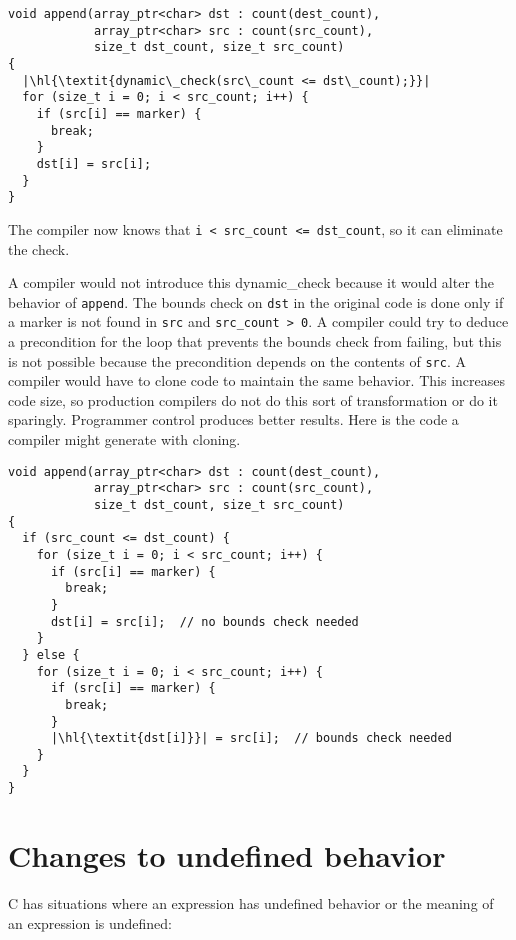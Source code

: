 \begin{lstlisting}[escapechar=\|]
void append(array_ptr<char> dst : count(dest_count),
            array_ptr<char> src : count(src_count),
            size_t dst_count, size_t src_count)
{
  |\hl{\textit{dynamic\_check(src\_count <= dst\_count);}}|
  for (size_t i = 0; i < src_count; i++) {
    if (src[i] == marker) {
      break;
    }
    dst[i] = src[i];
  }
}
\end{lstlisting}

The compiler now knows that \lstinline+i < src_count <= dst_count+,
so it can eliminate the check.

A compiler would not introduce this dynamic\_check because it would
alter the behavior of \lstinline+append+. The bounds check on \lstinline+dst+
in the original code is done only if a marker is not found in
\lstinline+src+ and \lstinline+src_count > 0+. A compiler could
try to deduce a precondition for the loop
that prevents the bounds check from failing, but this is
not possible because the precondition depends on the contents of
\lstinline+src+. A compiler would have to clone code to maintain the same
behavior. This increases code size, so production compilers do not do this
sort of transformation or do it sparingly. Programmer control produces
better results.   Here is the code a compiler might generate with cloning.

\begin{lstlisting}[escapechar=\|]
void append(array_ptr<char> dst : count(dest_count),
            array_ptr<char> src : count(src_count),
            size_t dst_count, size_t src_count)
{
  if (src_count <= dst_count) {
    for (size_t i = 0; i < src_count; i++) {
      if (src[i] == marker) {
        break;
      }
      dst[i] = src[i];  // no bounds check needed
    }
  } else {
    for (size_t i = 0; i < src_count; i++) {
      if (src[i] == marker) {
        break;
      }
      |\hl{\textit{dst[i]}}| = src[i];  // bounds check needed
    }
  }
}
\end{lstlisting}

\section{Changes to undefined behavior}
\label{section:changes-to-undefined-behavior}

C has situations where an expression has undefined behavior or the
meaning of an expression is undefined:

